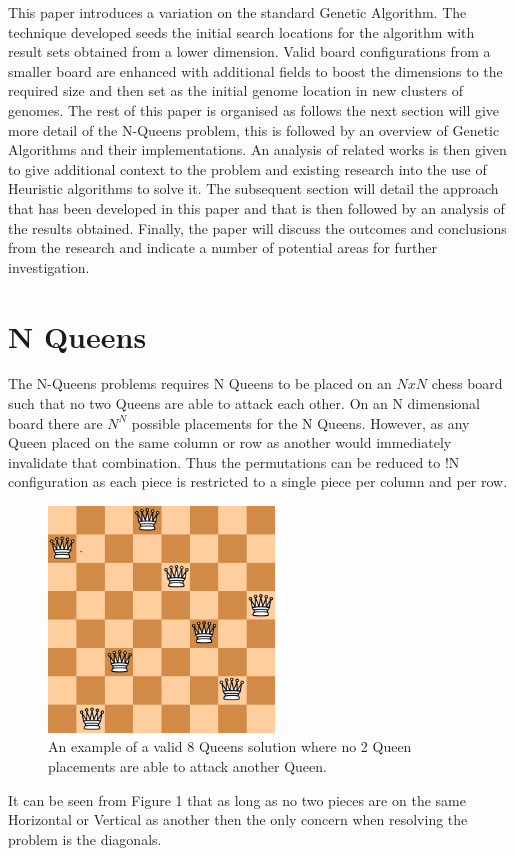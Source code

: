 \documentclass[a4paper,onecolumn,11pt]{article}
\begin{document}
This paper introduces a variation on the standard Genetic Algorithm. The technique developed seeds the initial search locations for the algorithm with result sets obtained from a lower dimension. Valid board configurations from a smaller board are enhanced with additional fields to boost the dimensions to the required size and then set as the initial genome location in new clusters of genomes. The rest of this paper is organised as follows the next section will give more detail of the N-Queens problem, this is followed by an overview of Genetic Algorithms and their implementations. An analysis of related works is then given to give additional context to the problem and existing research into the use of Heuristic algorithms to solve it. The subsequent section will detail the approach that has been developed in this paper and that is then followed by an analysis of the results obtained. Finally, the paper will discuss the outcomes and conclusions from the research and indicate a number of potential areas for further investigation.

\section{N Queens}
The N-Queens problems requires N Queens to be placed on an $NxN$ chess board such that no two Queens are able to attack each other. On an N dimensional board there are $N^{N}$ possible placements for the N Queens. However, as any Queen placed on the same column or row as another would immediately invalidate that combination. Thus the permutations can be reduced to !N configuration as each piece is restricted to a single piece per column and per row.

\begin{figure}[!htbp]
	\centering	
	\includegraphics[width=6cm, height=6cm]{Valid8QueensSolution}
	\caption{An example of a valid 8 Queens solution where no 2 Queen placements are able to attack another Queen.}
\end{figure}
It can be seen from Figure 1 that as long as no two pieces are on the same Horizontal or Vertical as another then the only concern when resolving the problem is the diagonals. 
\end{document}
